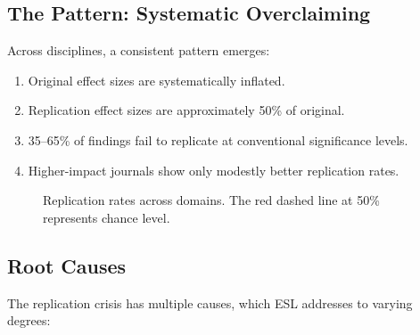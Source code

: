 \documentclass[11pt,a4paper]{article}
\begin{document}
\subsection{The Pattern: Systematic Overclaiming}

Across disciplines, a consistent pattern emerges:

\begin{enumerate}
    \item Original effect sizes are systematically inflated.
    \item Replication effect sizes are approximately 50\% of original.
    \item 35--65\% of findings fail to replicate at conventional significance levels.
    \item Higher-impact journals show only modestly better replication rates.
\end{enumerate}

\begin{figure}[h]
\centering
{}
\caption{Replication rates across domains. The red dashed line at 50\% represents chance level.}
\label{fig:replication-rates}
\end{figure}

\subsection{Root Causes}

The replication crisis has multiple causes, which ESL addresses to varying degrees:
\end{document}
